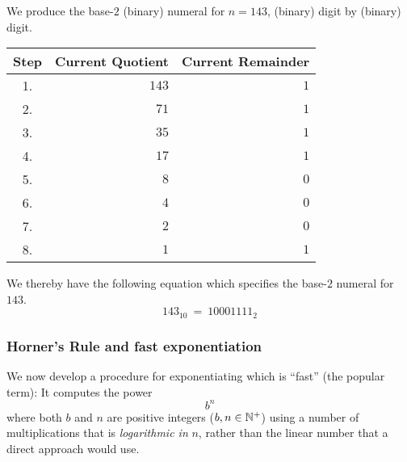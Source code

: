 \bigskip

We produce the base-$2$ (binary) numeral for $n = 143$, (binary) digit
by (binary) digit.

\medskip

\begin{tabular}{|c|r|r|}
\hline
Step &
Current Quotient &
Current Remainder \\
\hline
1. & $143$ & $1$ \\
2. & $71$  & $1$ \\
3. & $35$  & $1$ \\
4. & $17$  & $1$ \\
5. & $8$   & $0$ \\
6. & $4$   & $0$ \\
7. & $2$   & $0$ \\
8. & $1$   & $1$ \\
\hline
\end{tabular}

\medskip

\noindent
We thereby have the following equation which specifies the base-$2$
numeral for $143$.
\[ 143_{10} \ = \ 10001111_2 \]


\subsubsection{Horner's Rule and fast exponentiation} 

We now develop a procedure for exponentiating which is ``fast'' (the
popular term): It computes the power
\[ b^n \]
where both $b$ and $n$ are positive integers ($b, n \in \mathbb{N}^+$) using a
number of multiplications that is {\em logarithmic in} $n$, rather
than the linear number that a direct approach would use.

\medskip

\noindent {}

\bigskip

